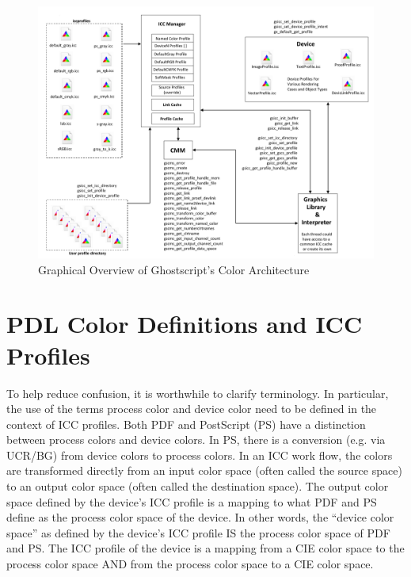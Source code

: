 \documentclass[12pt,notitlepage]{article}
\begin{document}
\begin{figure}
    \begin{center}
\includegraphics*[width=6.5in]{figures/architecture.pdf}
    \end{center}
   \caption{Graphical Overview of Ghostscript's Color Architecture}
    \label{fig:ICC_ARCH}
\end{figure}

\section{PDL Color Definitions and ICC Profiles}

To help reduce confusion, it is worthwhile to clarify terminology. In particular, the use of the terms process color and device color need to be defined in the context of ICC profiles. Both PDF\cite{PDF} and PostScript (PS) have a distinction between process colors and device colors.  In PS, there is
a conversion (e.g. via UCR/BG) from device colors to process colors.  In an ICC work flow, the colors are transformed directly from an input color space (often called the source space) to an output color space (often called the destination space).  The output color space defined by the device's ICC profile is a mapping to what PDF and PS define as the process color space of the device.  In other words, the ``device color space'' as defined by the device's ICC profile IS the process color space of PDF and PS.  The ICC profile of the device is a mapping from a CIE color space to the process color space AND from the process color space to a CIE color space.
\end{document}
